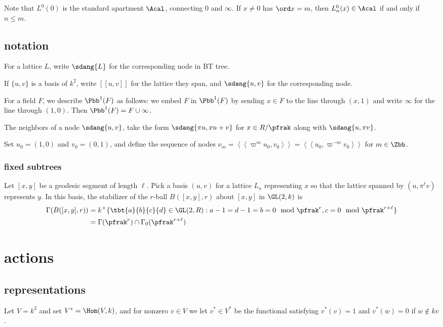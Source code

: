 \documentclass{book}
\begin{document}
Note that $L^0(0)$ is the standard apartment $\Acal$, connecting $0$ and $\infty$. If $x \neq 0$ has $\ord x = m$, then $L_n^0(x) \in \Acal$ if and only if $n \leq m$.

\subsection{notation}
For a lattice $L$, write $\sdang{L}$ for the corresponding node in BT tree.

If $\{u,v\}$ is a basis of $k^2$, write $\left[ \left[ u,v \right] \right]$ for the lattice they span, and $\sdang{u,v}$ for the corresponding node.


For a field $F$, we describe $\Pbb^1(F)$ as follows: we embed $F$ in $\Pbb^1(F)$ by sending $x\in F$ to the line through $(x,1)$ and write $\infty$ for the line through $(1,0)$. Then $\Pbb^1(F) = F \cup \infty$.

The neighbors of a node $\sdang{u,v}$, take the form $\sdang{\pi u , x u + v}$ for $x\in R/\pfrak$ along with $\sdang{u,\pi v}$.

Set $u_0 = (1,0)$ and $v_0 = (0,1)$, and define the sequence of nodes $\nu_m=\left\langle\left\langle\varpi^m u_0, v_0\right\rangle\right\rangle=\left\langle\left\langle u_0, \varpi^{-m} v_0\right\rangle\right\rangle$ for $m \in \Zbb$.

\subsubsection*{fixed subtrees}
Let $[x,y]$ be a geodesic segment of length $\ell$. Pick a basis $(u,v)$ for a lattice $L_x$ representing $x$ so that the lattice spanned by $(u,\pi^\ell v)$ represents $y$. In this basis, the stabilizer of the $r$-ball $B([x,y],r)$ about $[x,y]$ in $\GL(2,k)$ is
\begin{align*}
    \Gamma(B([x,y],r)) & =k^\times \{ \tbt{a}{b}{c}{d}\in \GL(2,R): a-1=d-1=b=0 \mod \pfrak^r, c=0\mod \pfrak^{r+\ell} \} \\
                       & = \Gamma(\pfrak^r) \cap \Gamma_0(\pfrak^{r+\ell})
\end{align*}







\section*{actions}
\subsection*{representations}
Let $V=k^2$ and set $V^*=\Hom(V,k)$, and for nonzero $v\in V$ we let $v^* \in V^*$ be the functional satisfying $v^*(v) = 1$ and $v^*(w) = 0$ if $w \notin kv$.
\end{document}
